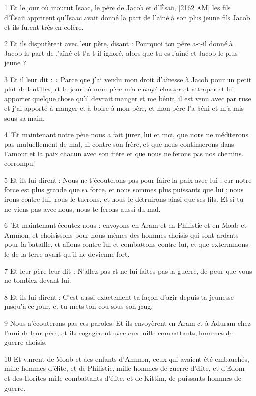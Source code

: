 \par 1 Et le jour où mourut Isaac, le père de Jacob et d'Ésaü, [2162 AM] les fils d'Ésaü apprirent qu'Isaac avait donné la part de l'aîné à son plus jeune fils Jacob et ils furent très en colère.
\par 2 Et ils disputèrent avec leur père, disant : Pourquoi ton père a-t-il donné à Jacob la part de l'aîné et t'a-t-il ignoré, alors que tu es l'aîné et Jacob le plus jeune ?
\par 3 Et il leur dit : « Parce que j'ai vendu mon droit d'aînesse à Jacob pour un petit plat de lentilles, et le jour où mon père m'a envoyé chasser et attraper et lui apporter quelque chose qu'il devrait manger et me bénir, il est venu avec par ruse et j'ai apporté à manger et à boire à mon père, et mon père l'a béni et m'a mis sous sa main.
\par 4 'Et maintenant notre père nous a fait jurer, lui et moi, que nous ne méditerons pas mutuellement de mal, ni contre son frère, et que nous continuerons dans l'amour et la paix chacun avec son frère et que nous ne ferons pas nos chemins. corrompu.'
\par 5 Et ils lui dirent : Nous ne t'écouterons pas pour faire la paix avec lui ; car notre force est plus grande que sa force, et nous sommes plus puissants que lui ; nous irons contre lui, nous le tuerons, et nous le détruirons ainsi que ses fils. Et si tu ne viens pas avec nous, nous te ferons aussi du mal.
\par 6 'Et maintenant écoutez-nous : envoyons en Aram et en Philistie et en Moab et Ammon, et choisissons pour nous-mêmes des hommes choisis qui sont ardents pour la bataille, et allons contre lui et combattons contre lui, et que exterminons-le de la terre avant qu'il ne devienne fort.
\par 7 Et leur père leur dit : N'allez pas et ne lui faites pas la guerre, de peur que vous ne tombiez devant lui.
\par 8 Et ils lui dirent : C'est aussi exactement ta façon d'agir depuis ta jeunesse jusqu'à ce jour, et tu mets ton cou sous son joug.
\par 9 Nous n'écouterons pas ces paroles. Et ils envoyèrent en Aram et à Aduram chez l'ami de leur père, et ils engagèrent avec eux mille combattants, hommes de guerre choisis.
\par 10 Et vinrent de Moab et des enfants d'Ammon, ceux qui avaient été embauchés, mille hommes d'élite, et de Philistie, mille hommes de guerre d'élite, et d'Edom et des Horites mille combattants d'élite. et de Kittim, de puissants hommes de guerre.
